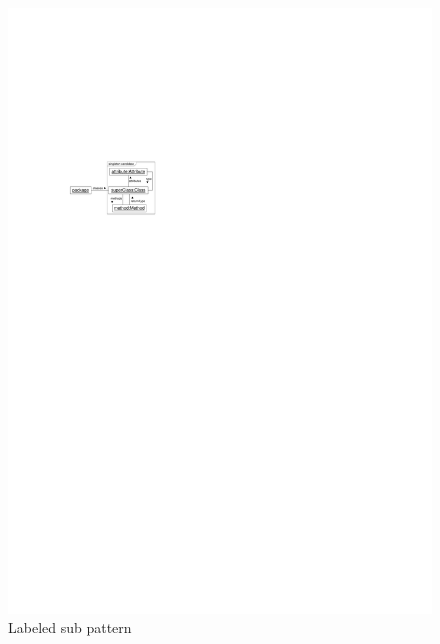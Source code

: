 \begin{figure}[htbp]
  \centering
  \includegraphics[scale=1.0]{figures/SubPatterns2}
  \caption{Labeled sub pattern}
  \label{fig:labeledSubPattern}
\end{figure}

